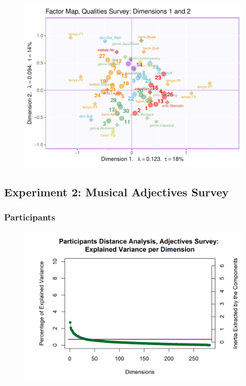\documentclass[
  english,
  man,floatsintext]{apa6}
\begin{document}
\begin{figure}

{\centering \includegraphics[width=0.75\linewidth]{Music-Descriptor-Space_files/figure-latex/factormapsQ-1} 

}

\caption{ }\label{fig:factormapsQ}
\end{figure}

\hypertarget{experiment-2-musical-adjectives-survey}{%
\subsection{Experiment 2: Musical Adjectives Survey}\label{experiment-2-musical-adjectives-survey}}

\hypertarget{participants-2}{%
\subsubsection{Participants}\label{participants-2}}

\begin{figure}  
  \begin{center}
    \includegraphics{./Music-Descriptor-Space_files/figure-latex/a.part.scree-1.png}
  \caption{ }\label{fig:apartscree}  
 \end{center}
\end{figure}
\end{document}
